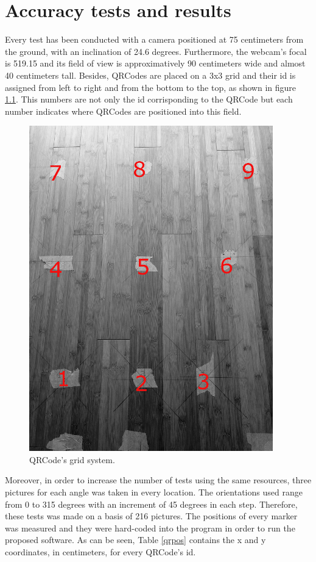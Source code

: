 \chapter{Accuracy tests and results}

Every test has been conducted with a camera positioned at 75 centimeters from the ground, with an inclination of 24.6 degrees. Furthermore, the webcam's focal is 519.15 and its field of view is approximatively 90 centimeters wide and almost 40 centimeters tall. Besides, QRCodes are placed on a 3x3 grid and their id is assigned from left to right and from the bottom to the top, as shown in figure \ref{field}. This numbers are not only the id corrisponding to the QRCode but each number indicates where QRCodes are positioned into this field.

\begin{figure}[hbt]
    \centering
    \includegraphics[scale=0.4]{img/field.png}
    \caption{QRCode's grid system. \label{field}}
\end{figure}
\newpage

Moreover, in order to increase the number of tests using the same resources, three pictures for each angle was taken in every location. The orientations used range from 0 to 315 degrees with an increment of 45 degrees in each step. Therefore, these tests was made on a basis of 216 pictures.
\newline
The positions of every marker was measured and they were hard-coded into the program in order to run the proposed software. As can be seen, Table \ref{qrpos} contains the x and y coordinates, in centimeters, for every QRCode's id.


